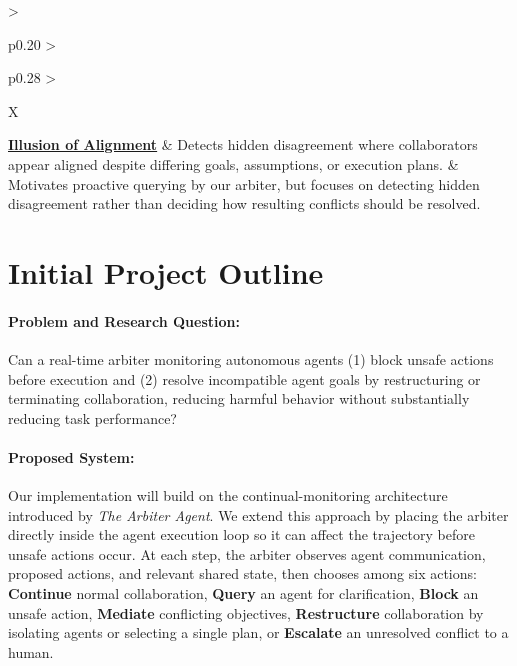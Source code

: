 \documentclass[11pt]{article}
\begin{document}
\begin{xltabular}{\textwidth}{
    >{\raggedright\arraybackslash}p{0.20\textwidth}
    >{\raggedright\arraybackslash}p{0.28\textwidth}
    >{\raggedright\arraybackslash}X
}
\midrule

\href{https://arxiv.org/abs/2608.08210}
{\textbf{Illusion of Alignment}}
&
Detects hidden disagreement where collaborators appear aligned despite differing goals, assumptions, or execution plans.
&
Motivates proactive querying by our arbiter, but focuses on detecting hidden disagreement rather than deciding how resulting conflicts should be resolved. \\

\end{xltabular}

\normalsize

\newpage

\section{Initial Project Outline}
\paragraph{Problem and Research Question:} Can a real-time arbiter monitoring autonomous agents (1) block unsafe actions before execution and (2) resolve incompatible agent goals by restructuring or terminating collaboration, reducing harmful behavior without substantially reducing task performance?

\vspace{-0.5em}

\paragraph{Proposed System:}
Our implementation will build on the continual-monitoring architecture introduced by \textit{The Arbiter Agent}. We extend this approach by placing the arbiter directly inside the agent execution loop so it can affect the trajectory before unsafe actions occur. At each step, the arbiter observes agent communication, proposed actions, and relevant shared state, then chooses among six actions: \textbf{Continue} normal collaboration, \textbf{Query} an agent for clarification, \textbf{Block} an unsafe action, \textbf{Mediate} conflicting objectives, \textbf{Restructure} collaboration by isolating agents or selecting a single plan, or \textbf{Escalate} an unresolved conflict to a human. 

\vspace{-0.5em}
\end{document}
